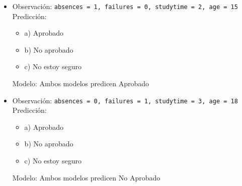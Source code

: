 \begin{itemize}
    \item Observación: \texttt{absences = 1, failures = 0, studytime = 2, age = 15}\\
    Predicción:
    \begin{itemize}
        \item a) Aprobado
        \item b) No aprobado
        \item c) No estoy seguro
    \end{itemize}
    Modelo: Ambos modelos predicen Aprobado

    \item Observación: \texttt{absences = 0, failures = 1, studytime = 3, age = 18}\\
    Predicción:
    \begin{itemize}
        \item a) Aprobado
        \item b) No aprobado
        \item c) No estoy seguro
    \end{itemize}
    Modelo: Ambos modelos predicen No Aprobado
\end{itemize}

